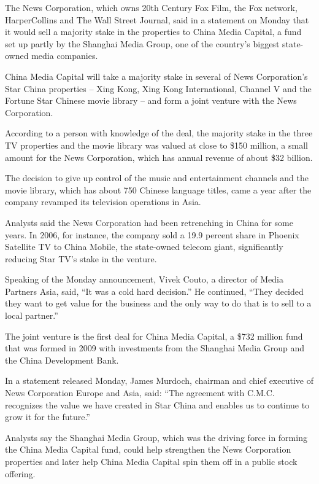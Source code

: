 ﻿\documentclass[12pt]{article}
\begin{document}
The News Corporation, which owns 20th Century Fox Film, the Fox network, HarperCollins and The Wall
Street Journal, said in a statement on Monday that it would sell a majority stake in the properties
to China Media Capital, a fund set up partly by the Shanghai Media Group, one of the country's
biggest state-owned media companies.

China Media Capital will take a majority stake in several of News Corporation's Star China
properties -- Xing Kong, Xing Kong International, Channel V and the Fortune Star Chinese movie
library -- and form a joint venture with the News Corporation.

According to a person with knowledge of the deal, the majority stake in the three TV properties and
the movie library was valued at close to \$150 million, a small amount for the News Corporation,
which has annual revenue of about \$32 billion.

The decision to give up control of the music and entertainment channels and the movie library, which
has about 750 Chinese language titles, came a year after the company revamped its television
operations in Asia.

Analysts said the News Corporation had been retrenching in China for some years. In 2006, for
instance, the company sold a 19.9 percent share in Phoenix Satellite TV to China Mobile, the
state-owned telecom giant, significantly reducing Star TV's stake in the venture.

Speaking of the Monday announcement, Vivek Couto, a director of Media Partners Asia, said, ``It was
a cold hard decision.'' He continued, ``They decided they want to get value for the business and the
only way to do that is to sell to a local partner.''

The joint venture is the first deal for China Media Capital, a \$732 million fund that was formed in
2009 with investments from the Shanghai Media Group and the China Development Bank.

In a statement released Monday, James Murdoch, chairman and chief executive of News Corporation
Europe and Asia, said: ``The agreement with C.M.C. recognizes the value we have created in Star
China and enables us to continue to grow it for the future.''

Analysts say the Shanghai Media Group, which was the driving force in forming the China Media
Capital fund, could help strengthen the News Corporation properties and later help China Media
Capital spin them off in a public stock offering.
\end{document}
